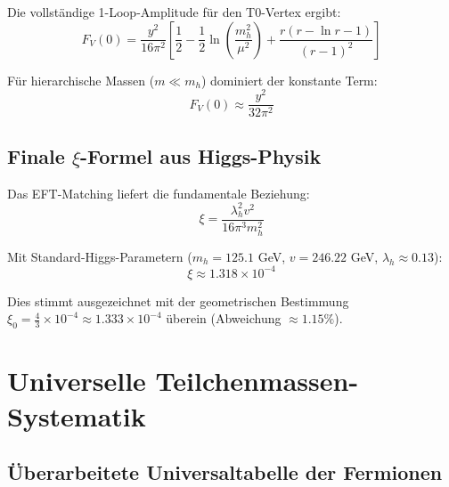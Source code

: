 	Die vollständige 1-Loop-Amplitude für den T0-Vertex ergibt:
	\begin{equation}
		F_V(0) = \frac{y^2}{16\pi^2}\left[\frac{1}{2} - \frac{1}{2}\ln\left(\frac{m_h^2}{\mu^2}\right) + \frac{r(r-\ln r-1)}{(r-1)^2}\right]
	\end{equation}
	
	Für hierarchische Massen ($m \ll m_h$) dominiert der konstante Term:
	\begin{equation}
		F_V(0) \approx \frac{y^2}{32\pi^2}
	\end{equation}
	
	\subsection{Finale $\xi$-Formel aus Higgs-Physik}
	\label{subsec:finale_xi_formel}
	
	Das EFT-Matching liefert die fundamentale Beziehung:
	\begin{equation}
		\boxed{\xi = \frac{\lambda_h^2 v^2}{16\pi^3 m_h^2}}
	\end{equation}
	
	Mit Standard-Higgs-Parametern ($m_h = 125.1$ GeV, $v = 246.22$ GeV, $\lambda_h \approx 0.13$):
	\begin{equation}
		\xi \approx 1.318 \times 10^{-4}
	\end{equation}
	
	Dies stimmt ausgezeichnet mit der geometrischen Bestimmung $\xi_0 = \frac{4}{3} \times 10^{-4} \approx 1.333 \times 10^{-4}$ überein (Abweichung $\approx 1.15\%$).
	
	\section{Universelle Teilchenmassen-Systematik}
	\label{sec:universal_masses}
	
	\subsection{Überarbeitete Universaltabelle der Fermionen}
	\label{subsec:universal_table}
	
